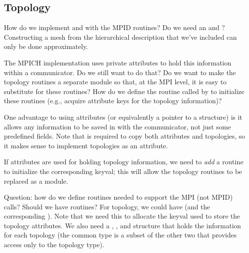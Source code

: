 \documentclass{article}
\begin{document}

\subsection{Topology}

How do we implement  and 
with the MPID routines?   
Do we need an  and
?  Constructing a mesh from the 
hierarchical description that we've included can only be done
approximately.

The MPICH implementation uses private attributes to hold this information 
within a communicator.  Do we still want to do that?  Do we want to make the
topology routines a separate module so that, at the MPI level, it is easy to
substitute for these routines?  How do we define the routine called by
 to initialize these routines (e.g., acquire attribute keys
for the topology information)?

One advantage to using attributes (or equivalently a pointer to a
structure) is it allows any information to be saved in with the
communicator, not just some predefined fields.  Note that
 is required to copy both attributes and
topologies, so it makes sense to implement topologies as an attribute.

If attributes are used for holding topology information, we need to
\emph{add} a routine to initialize the corresponding keyval; this will
allow the topology routines to be replaced as a module.

Question: how do we define routines needed to support the MPI (not
MPID) calls?  Should we have  routines?  For topology, we
could have  (and the corresponding
).   Note that we need this to allocate the
keyval used to store the topology attributes.  We also need a
, , and
 structure that holds the information for each
topology (the common type is a subset of the other two that provides access
only to the topology type).
\end{document}
